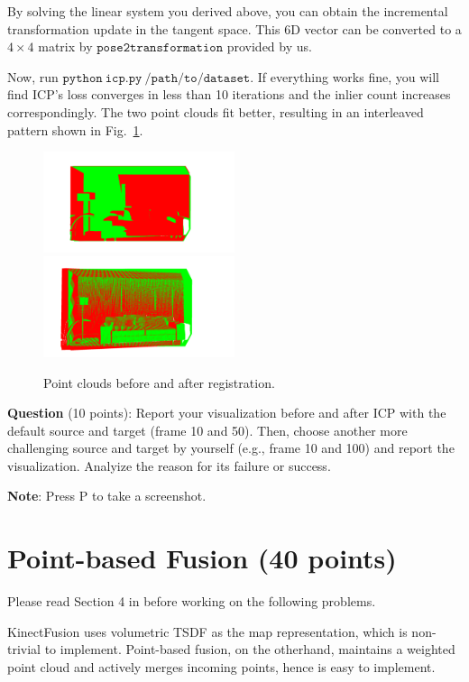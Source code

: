 \documentclass[12pt, a4paper]{article}
\begin{document}
By solving the linear system you derived above, you can obtain the incremental transformation update in the tangent space. This 6D vector can be converted to a $4\times 4$ matrix by $\mathtt{pose2transformation}$ provided by us.

Now, run $\mathtt{python~icp.py~/path/to/dataset}$. If everything works fine, you will find ICP's loss converges in less than 10 iterations and the inlier count increases correspondingly. The two point clouds fit better, resulting in an interleaved pattern shown in Fig.~\ref{fig:icp}.
\begin{figure}
	\includegraphics[width=0.5\textwidth]{figures/before.png}
	\includegraphics[width=0.5\textwidth]{figures/after.png}
	\caption{Point clouds before and after registration.}\label{fig:icp}
\end{figure}

\textbf{Question} (10 points): Report your visualization before and after ICP with the default source and target (frame 10 and 50). Then, choose another more challenging source and target by yourself (e.g., frame 10 and 100) and report the visualization. Analyize the reason for its failure or success.

\textbf{Note}: Press P to take a screenshot.

\section{Point-based Fusion (40 points)}

Please read Section 4 in \cite{fusion} before working on the following
problems.

KinectFusion uses volumetric TSDF as the map representation, which is non-trivial to implement. Point-based fusion, on the otherhand, maintains a weighted point cloud and actively merges incoming points, hence is easy to implement.
\end{document}
